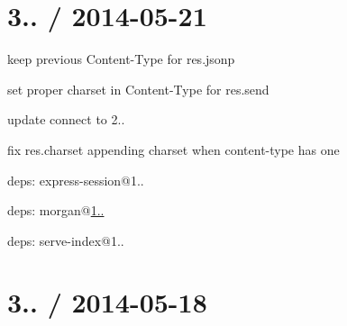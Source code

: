 \section*{3.. / 2014-\/05-\/21 }


\begin{DoxyItemize}
\item keep previous {\ttfamily Content-\/\+Type} for {\ttfamily res.\+jsonp}
\item set proper {\ttfamily charset} in {\ttfamily Content-\/\+Type} for {\ttfamily res.\+send}
\item update connect to 2..
\begin{DoxyItemize}
\item fix {\ttfamily res.\+charset} appending charset when {\ttfamily content-\/type} has one
\item deps\+: express-\/session@1..
\item deps\+: morgan@\hyperlink{namespace1_1_11_1_11}{1..}
\item deps\+: serve-\/index@1..
\end{DoxyItemize}
\end{DoxyItemize}

\section*{3.. / 2014-\/05-\/18 }



